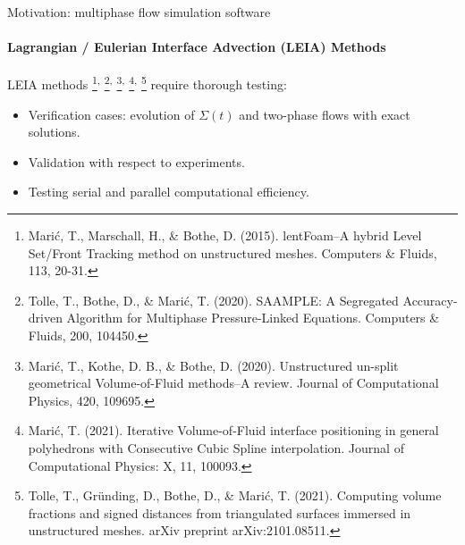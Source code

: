 \begin{frame}{Motivation: multiphase flow simulation software}
    \framesubtitle{Lagrangian / Eulerian Interface Advection (LEIA) Methods}

    \vfill
    LEIA methods
    \footnote{Marić, T., Marschall, H., \& Bothe, D. (2015). lentFoam–A hybrid Level Set/Front Tracking method on unstructured meshes. Computers \& Fluids, 113, 20-31.}\textsuperscript{,}
    \footnote{\footnotesize Tolle, T., Bothe, D., \& Marić, T. (2020). SAAMPLE: A Segregated Accuracy-driven Algorithm for Multiphase Pressure-Linked Equations. Computers \& Fluids, 200, 104450.}\textsuperscript{,}
    \footnote{Marić, T., Kothe, D. B., \& Bothe, D. (2020). Unstructured un-split geometrical Volume-of-Fluid methods–A review. Journal of Computational Physics, 420, 109695.}\textsuperscript{,}
    \footnote{\footnotesize Marić, T. (2021). Iterative Volume-of-Fluid interface positioning in general polyhedrons with Consecutive Cubic Spline interpolation. Journal of Computational Physics: X, 11, 100093.}\textsuperscript{,}
    \footnote{\footnotesize Tolle, T., Gründing, D., Bothe, D., \& Marić, T. (2021). Computing volume fractions and signed distances from triangulated surfaces immersed in unstructured meshes. arXiv preprint arXiv:2101.08511.}
    require thorough testing: 
    \begin{itemize}
        \item Verification cases: evolution of $\Sigma(t)$ and two-phase flows with exact solutions. 

        \item Validation with respect to experiments.  

        \item Testing serial and parallel computational efficiency. 
    \end{itemize}

\end{frame}



